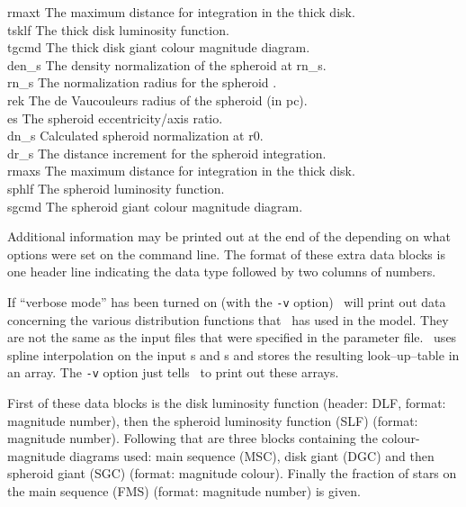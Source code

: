 \begin{tabbing}
rmaxt  \> The maximum distance for integration in the thick disk. \\
tsklf  \> The thick disk luminosity function. \\
tgcmd  \> The thick disk giant colour magnitude diagram. \\
den\_s \> The density normalization of the spheroid at rn\_s. \\
rn\_s  \> The normalization radius for the spheroid \lf. \\
rek    \> The de Vaucouleurs radius of the spheroid (in pc). \\
es     \> The spheroid eccentricity/axis ratio. \\
dn\_s  \> Calculated spheroid normalization at r0. \\
dr\_s  \> The distance increment for the spheroid integration. \\
rmaxs  \> The maximum distance for integration in the thick disk. \\
sphlf  \> The spheroid luminosity function. \\
sgcmd  \> The spheroid giant colour magnitude diagram. \\
\end{tabbing}

Additional information may be printed out at the end of the depending on
what options were set on the command line. The format of these extra data
blocks is one header line indicating the data type followed by two
columns of numbers. 

If ``verbose mode'' has been turned on (with the {\tt -v} option) 
\egm\ will print out data concerning the various distribution functions
that \egm\ has used in the model. They are not the same as the input files 
that were specified in
the parameter file. \egm\ uses spline interpolation on the input
\lf s and \cmd s and stores the resulting look--up--table in an array.
The  {\tt -v} option just tells \egm\ to print out these arrays.

First of these data blocks is the disk luminosity function
(header: DLF, format: magnitude  number),  then  the spheroid luminosity
function  (SLF) (format: magnitude  number).  Following  that are
three blocks  containing  the  colour-magnitude  diagrams  used:
main  sequence (MSC),  disk giant (DGC) and then  spheroid giant
(SGC) (format: magnitude colour). Finally the  fraction of stars
on the  main sequence (FMS) (format: magnitude  number) is given.

